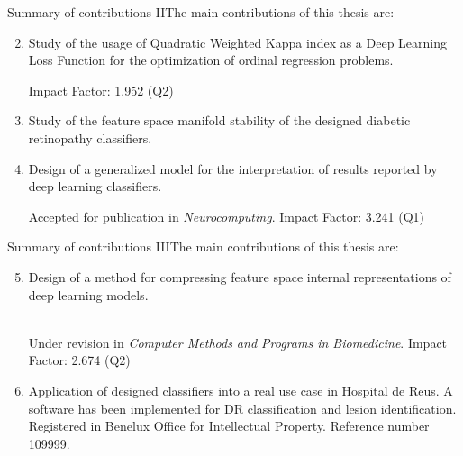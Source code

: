 \documentclass{beamer}
\begin{document}
\begin{frame}{Summary of contributions II}{The main contributions of this thesis are:}

\begin{enumerate}
	\setcounter{enumi}{1}
		
	\item Study of the usage of Quadratic Weighted Kappa index as a Deep Learning Loss Function for the optimization of ordinal regression problems.

	 Impact Factor: 1.952 (Q2)

	\item Study of the feature space manifold stability of the designed diabetic retinopathy classifiers.
	
	\item Design of a generalized model for the interpretation of results reported by deep learning classifiers.
	
	 Accepted for publication in \emph{Neurocomputing}. Impact Factor: 3.241 (Q1)	
\end{enumerate}
\end{frame}


\begin{frame}{Summary of contributions III}{The main contributions of this thesis are:}

\begin{enumerate}
	\setcounter{enumi}{4}
	
	\item Design of a method for compressing feature space internal representations of deep learning models.
	
	 \\Under revision in \emph{Computer Methods and Programs in Biomedicine}. Impact Factor: 2.674 (Q2)
	
	\item Application of designed classifiers into a real use case in Hospital de Reus. A software has been implemented for DR classification and lesion identification. Registered in Benelux Office for Intellectual Property. Reference number 109999.	
\end{enumerate}
\end{frame}
\end{document}

